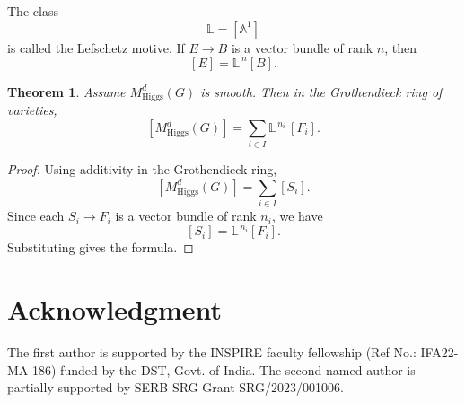 \documentclass[11pt, reqno]{amsart}
\numberwithin{equation}{section}
\newtheorem{theorem}{Theorem}[section]
\theoremstyle{definition}
\begin{document}
The class
\[
\mathbb{L} = [\mathbb{A}^1]
\]
is called the Lefschetz motive.
If $E \to B$ is a vector bundle of rank $n$, then
\[
[E] = \mathbb{L}^{\,n}[B].
\]

\begin{theorem}
Assume $M^d_{\mathrm{Higgs}}(G)$ is smooth.
Then in the Grothendieck ring of varieties,
\[
\left[
M^d_{\mathrm{Higgs}}(G)
\right]
=
\sum_{i\in I}
\mathbb{L}^{\,n_i}
\,[F_i].
\]
\end{theorem}

\begin{proof}
Using additivity in the Grothendieck ring,
\[
\left[
M^d_{\mathrm{Higgs}}(G)
\right]
=
\sum_{i\in I}
[S_i].
\]
Since each $S_i \to F_i$ is a vector bundle of rank $n_i$,
we have
\[
[S_i] = \mathbb{L}^{\,n_i}[F_i].
\]
Substituting gives the formula.
\end{proof}




\section*{Acknowledgment}
The first author is supported by the INSPIRE faculty fellowship (Ref No.: IFA22-MA 186) funded by the DST, Govt. of India. The second named author is partially supported by SERB SRG Grant SRG/2023/001006.
\end{document}
